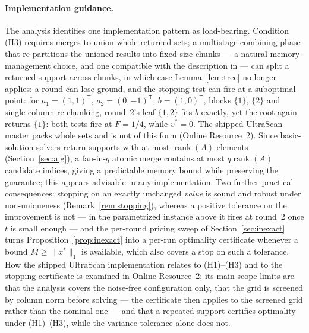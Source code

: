 \documentclass[pdflatex,sn-mathphys-num]{sn-jnl}
\theoremstyle{thmstyleone}
\theoremstyle{thmstyletwo}
\newcommand{\T}{{\mathsf T}}
\begin{document}
\paragraph{Implementation guidance.}
The analysis identifies one implementation pattern as load-bearing.
Condition (H3) requires merges to union whole returned sets; a
multistage combining phase that re-partitions the unioned results into
fixed-size chunks --- a natural memory-management choice, and one
compatible with the description in \cite[Section~4.1]{brookes2006} ---
can
split a returned support across chunks, in which case
Lemma~\ref{lem:tree} no longer applies: a round can lose ground, and
the stopping test can fire at a suboptimal point: for
$a_1=(1,1)^{\T}$, $a_2=(0,-1)^{\T}$, $b=(1,0)^{\T}$, blocks $\{1\}$,
$\{2\}$ and single-column re-chunking, round~2's leaf $\{1,2\}$ fits
$b$ exactly, yet the root again returns $\{1\}$: both tests fire at
$F=1/4$, while $v^*=0$. The shipped UltraScan master packs whole sets and is not of this form
(Online Resource~2). Since
basic-solution solvers return supports with at most
$\operatorname{rank}(A)$ elements (Section~\ref{sec:alg}), a
fan-in-$q$ atomic merge contains at most $q\operatorname{rank}(A)$
candidate indices, giving a predictable memory bound while preserving
the guarantee; this appears advisable in any implementation. Two
further practical consequences: stopping on an exactly unchanged
\emph{value} is sound and robust under non-uniqueness
(Remark~\ref{rem:stopping}), whereas a positive tolerance on the
improvement is not --- in the parametrized instance above it fires at
round~2 once $t$ is small enough --- and the per-round pricing sweep of
Section~\ref{sec:inexact} turns Proposition~\ref{prop:inexact} into a
per-run optimality certificate whenever a bound
$M\ge\lVert x^*\rVert_1$ is available, which also covers a stop on
such a tolerance. How the
shipped UltraScan implementation relates to (H1)--(H3) and to the
stopping certificate is examined in Online Resource~2; its main scope
limits are that the analysis covers the noise-free configuration
only, that the grid is screened by column norm before solving --- the
certificate then applies to the screened grid rather than the nominal
one --- and that a repeated support certifies optimality under
(H1)--(H3), while the variance tolerance alone does not.
\end{document}
